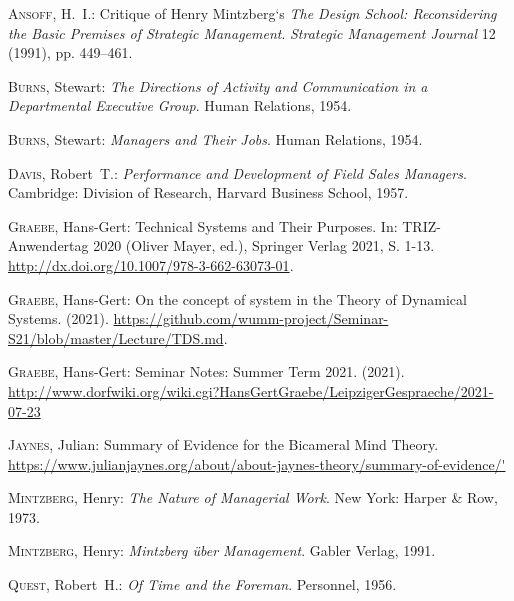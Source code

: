 \documentclass[a4paper,12pt]{article}
\begin{document}
\newpage

\begin{thebibliography}{Gra21b}

 \textsc{Ansoff}, H.~I.: \newblock Critique of Henry
  Mintzberg‘s \emph{The Design School: Reconsidering the Basic Premises of
  Strategic Management}.  \emph{Strategic Management Journal}
  12 (1991), pp. 449--461.

 \textsc{Burns}, Stewart: \newblock \emph{The
  Directions of Activity and Communication in a Departmental Executive Group}.
  \newblock Human Relations, 1954.

 \textsc{Burns}, Stewart: \newblock \emph{Managers
  and Their Jobs}.  \newblock Human Relations, 1954.

 \textsc{Davis}, Robert~T.: \newblock \emph{Performance
  and Development of Field Sales Managers}.  \newblock Cambridge: Division of
  Research, Harvard Business School, 1957.

 \textsc{Graebe}, Hans-Gert: \newblock Technical
  Systems and Their Purposes.  \newblock In: TRIZ-Anwendertag 2020 (Oliver
  Mayer, ed.), Springer Verlag 2021, S. 1-13. \newblock
  \url{http://dx.doi.org/10.1007/978-3-662-63073-01}.

 \textsc{Graebe}, Hans-Gert: \newblock On the
  concept of system in the Theory of Dynamical Systems.  \newblock (2021).
  \newblock
  \url{https://github.com/wumm-project/Seminar-S21/blob/master/Lecture/TDS.md}.
  
 \textsc{Graebe}, Hans-Gert: \newblock Seminar Notes:
  Summer Term 2021.  \newblock (2021).  \newblock
  \url{http://www.dorfwiki.org/wiki.cgi?HansGertGraebe/LeipzigerGespraeche/2021-07-23}

 \textsc{Jaynes}, Julian: \newblock Summary of Evidence
  for the Bicameral Mind Theory.  \newblock
  \url{https://www.julianjaynes.org/about/about-jaynes-theory/summary-of-evidence/'}

 \textsc{Mintzberg}, Henry: \newblock \emph{The
  Nature of Managerial Work}.  \newblock New York: Harper \& Row, 1973.

 \textsc{Mintzberg}, Henry: \newblock
  \emph{Mintzberg über Management}.  \newblock Gabler Verlag, 1991.

 \textsc{Quest}, Robert~H.: \newblock \emph{Of Time and
  the Foreman}.  \newblock Personnel, 1956.


\end{thebibliography}
\end{document}
